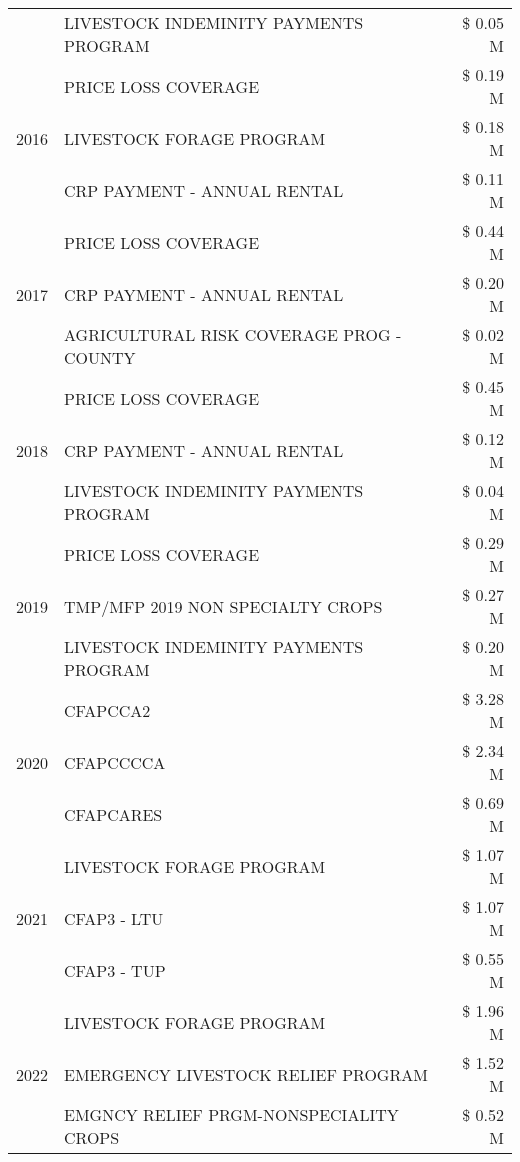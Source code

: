 \begin{tabular}{llr}
 & LIVESTOCK INDEMINITY PAYMENTS PROGRAM & \$ 0.05 M \\
\cline{1-3}
\multirow[t]{3}{*}{2016} & PRICE LOSS COVERAGE & \$ 0.19 M \\
 & LIVESTOCK FORAGE PROGRAM & \$ 0.18 M \\
 & CRP PAYMENT - ANNUAL RENTAL & \$ 0.11 M \\
\cline{1-3}
\multirow[t]{3}{*}{2017} & PRICE LOSS COVERAGE & \$ 0.44 M \\
 & CRP PAYMENT - ANNUAL RENTAL & \$ 0.20 M \\
 & AGRICULTURAL RISK COVERAGE PROG - COUNTY & \$ 0.02 M \\
\cline{1-3}
\multirow[t]{3}{*}{2018} & PRICE LOSS COVERAGE & \$ 0.45 M \\
 & CRP PAYMENT - ANNUAL RENTAL & \$ 0.12 M \\
 & LIVESTOCK INDEMINITY PAYMENTS PROGRAM & \$ 0.04 M \\
\cline{1-3}
\multirow[t]{3}{*}{2019} & PRICE LOSS COVERAGE & \$ 0.29 M \\
 & TMP/MFP 2019 NON SPECIALTY CROPS & \$ 0.27 M \\
 & LIVESTOCK INDEMINITY PAYMENTS PROGRAM & \$ 0.20 M \\
\cline{1-3}
\multirow[t]{3}{*}{2020} & CFAPCCA2 & \$ 3.28 M \\
 & CFAPCCCCA & \$ 2.34 M \\
 & CFAPCARES & \$ 0.69 M \\
\cline{1-3}
\multirow[t]{3}{*}{2021} & LIVESTOCK FORAGE PROGRAM & \$ 1.07 M \\
 & CFAP3 - LTU & \$ 1.07 M \\
 & CFAP3 - TUP & \$ 0.55 M \\
\cline{1-3}
\multirow[t]{3}{*}{2022} & LIVESTOCK FORAGE PROGRAM & \$ 1.96 M \\
 & EMERGENCY LIVESTOCK RELIEF PROGRAM & \$ 1.52 M \\
 & EMGNCY RELIEF PRGM-NONSPECIALITY CROPS & \$ 0.52 M \\
\cline{1-3}
\bottomrule
\end{tabular}
